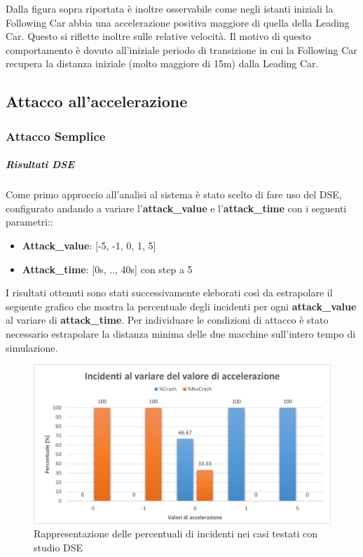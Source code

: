 Dalla figura sopra riportata è inoltre osservabile come negli istanti iniziali la Following Car abbia una accelerazione positiva maggiore di quella della Leading Car. Questo si riflette inoltre sulle relative velocità. Il motivo di questo comportamento è dovuto all'iniziale periodo di transizione in cui la Following Car recupera la distanza iniziale (molto maggiore di 15m) dalla Leading Car. 

\subsection{Attacco all'accelerazione}
\subsubsection{Attacco Semplice}
\subparagraph{Risultati DSE}
Come primo approccio all'analisi al sistema è stato scelto di fare uso del DSE, configurato andando a variare l'\textbf{attack\_value} e l'\textbf{attack\_time} con i seguenti parametri::
\begin{itemize}
	\item \textbf{Attack\_value}: [-5, -1, 0, 1, 5]
	\item \textbf{Attack\_time}: [0s, .., 40s] con step a 5
\end{itemize}
I risultati ottenuti sono stati successivamente eleborati così da estrapolare il seguente grafico che mostra la percentuale degli incidenti per ogni \textbf{attack\_value} al variare di \textbf{attack\_time}. Per individuare le condizioni di attacco è stato necessario estrapolare la distanza minima delle due macchine sull'intero tempo di simulazione.

\begin{figure}[H]
	\centering
	\includegraphics[width=\textwidth]{img/PlotPercentageIncidenteAttackAccel.png}
	\caption{Rappresentazione delle percentuali di incidenti nei casi testati con studio DSE}
\end{figure}


